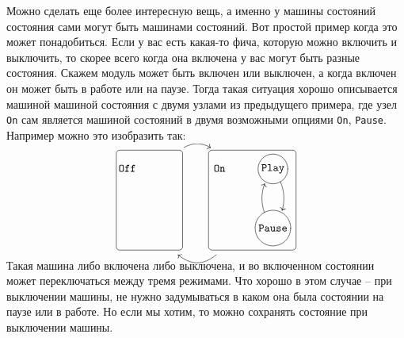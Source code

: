 \documentclass{article}
\begin{document}
{Можно сделать еще более интересную вещь, а именно у машины состояний состояния сами могут быть машинами состояний.
Вот простой пример когда это может понадобиться.
Если у вас есть какая-то фича, которую можно включить и выключить, то скорее всего когда она включена у вас могут быть разные состояния.
Скажем модуль может быть включен или выключен, а когда включен он может быть в работе или на паузе.
Тогда такая ситуация хорошо описывается машиной машиной состояния с двумя узлами из предыдущего примера, где узел \verb"On" сам является машиной состояний в двумя возможными опциями \verb"On", \verb"Pause".
Например можно это изобразить так:
\[
\xymatrix{
  {\texttt{Off}}\save="C" \restore
  &
  {\phantom{\texttt{On}}}
  \ar@<3ex>@/^10pt/[r]&
  {\texttt{On}}\save="A" \restore
  &
  *+=+[o][F-]{\texttt{Play}}\ar@/^10pt/[d]\\
  {}&
  {}{}\save="D" \restore
 &
  {} \ar@<5ex>@/^10pt/[l]&
  *+=+[o][F-]{\texttt{Pause}} \save="B" \restore\ar@/^10pt/[u]
  \save"A" + <-10pt, 17pt>="AA" \restore 
   \save "B" + <15pt, -14pt>="BB"\restore
  {\save "AA"."BB"*+[F-:<3pt>]\frm{}\restore}
    \save"C" + <-10pt, 17pt>="CC" \restore 
   \save "D" + <1pt, -14pt>="DD"\restore
  {\save "CC"."DD"*+[F-:<3pt>]\frm{}\restore}
  \\
}
\]
Такая машина либо включена либо выключена, и во включенном состоянии может переключаться между тремя режимами. 
Что хорошо в этом случае -- при выключении машины, не нужно задумываться в каком она была состоянии на паузе или в работе.
Но если мы хотим, то можно сохранять состояние при выключении машины.

}
\end{document}
